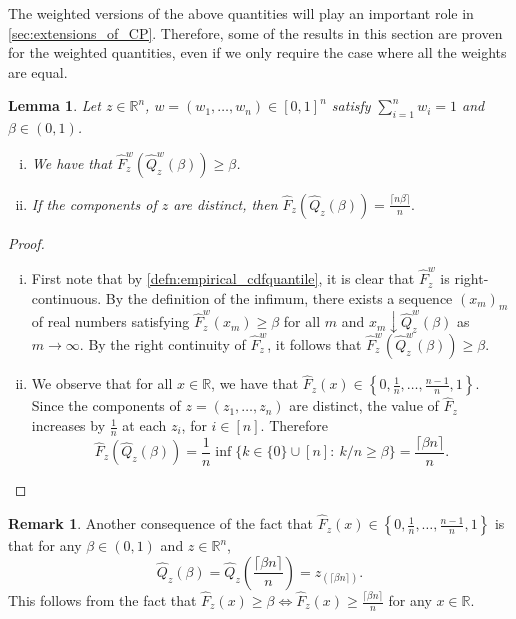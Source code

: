 \documentclass[11pt, titlepage]{article} %
\numberwithin{equation}{section}
\newtheorem{lemma}{Lemma}
\theoremstyle{definition}
\newtheorem{remark}{Remark}
\numberwithin{theorem}{section}
\numberwithin{lemma}{section}
\numberwithin{corollary}{section}
\numberwithin{proposition}{section}
\numberwithin{definition}{section}
\numberwithin{remark}{section}
\begin{document}
\noindent
The weighted versions of the above quantities will play an important role in \cref{sec:extensions_of_CP}. Therefore, some of the results in this section are proven for the weighted quantities, even if we only require the case where all the weights are equal.

\begin{lemma} Let \(z \in \mathbb{R}^n\), \(w = (w_1, \ldots, w_n) \in [0,1]^n\) satisfy \(\sum_{i=1}^n w_i = 1\) and \(\beta \in (0,1)\).
    \begin{enumerate}[(i)] \itemsep0em
        \item We have that \(\hat{F}^w_z\left(\hat{Q}^w_z(\beta) \right) \geq \beta\).
        \item If the components of \(z\) are distinct, then \(\hat{F}_z\left(\hat{Q}_z(\beta)\right) = \frac{\lceil{n\beta}\rceil}{n}.\)
    \end{enumerate} 
\label{lemma:cdfquantile}
\end{lemma}
\begin{proof}

    \begin{enumerate}[(i)] \itemsep0em
        \item First note that by \cref{defn:empirical_cdfquantile}, it is clear that \(\hat{F}^w_z\) is right-continuous. By the definition of the infimum, there exists a sequence \((x_m)_m\) of real numbers satisfying \(\hat{F}^w_z(x_m) \geq \beta\) for all \(m\) and \(x_m \downarrow \hat{Q}^w_z(\beta)\) as \(m \to \infty\). By the right continuity of \(\hat{F}^w_z\), it follows that \(\hat{F}^w_z\left(\hat{Q}^w_z(\beta) \right) \geq \beta\).
        \item We observe that for all \(x \in \mathbb{R}\), we have that \(\hat{F}_z(x) \in \left\{0, \frac{1}{n}, \ldots, \frac{n-1}{n}, 1\right\}\). Since the components of \(z = (z_1, \ldots, z_n)\) are distinct, the value of \(\hat{F}_z\) increases by \(\frac{1}{n}\) at each \(z_i\), for \(i \in [n]\). Therefore \[\hat{F}_z\left(\hat{Q}_z(\beta)\right) = \frac{1}{n} \inf \{k \in \{0\} \cup [n]: \ k/n \geq \beta \} = \frac{\lceil{\beta n}\rceil}{n}.\]
    \end{enumerate}
\end{proof}

\begin{remark}
    Another consequence of the fact that \(\hat{F}_z(x) \in \left\{0, \frac{1}{n}, \ldots, \frac{n-1}{n}, 1\right\}\) is that for any \(\beta \in (0,1)\) and \(z \in \mathbb{R}^n\), \[\hat{Q}_z(\beta) = \hat{Q}_z\left( \frac{\lceil \beta n \rceil}{n} \right) = z_{(\lceil \beta n \rceil)}.\] This follows from the fact that \(\hat{F}_z(x) \geq \beta \iff \hat{F}_z(x) \geq \frac{\lceil \beta n \rceil}{n}\) for any \(x \in \mathbb{R}\).
\label{rmk:order_stat_quantile}
\end{remark}
\end{document}
